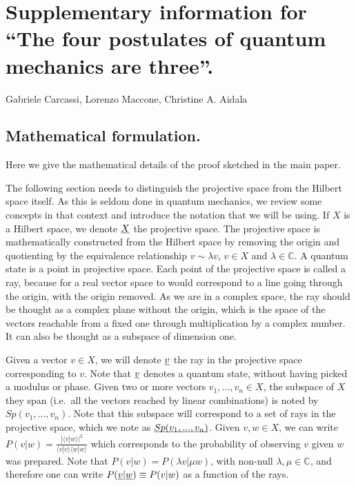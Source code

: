 \documentclass[aps,prl,amsmath,amssymb,twocolumn,nofootinbib]{revtex4}
\theoremstyle{plain}
\theoremstyle{definition}
\theoremstyle{remark}
\newcommand{\pj}[1] {\underbar{$#1$}}
\def\>{\rangle}
\def\<{\langle}
\begin{document}
	
	
	\section{Supplementary information for ``The four postulates of quantum
		mechanics are three''. }\label{app}
	\par\noindent 
	Gabriele Carcassi, Lorenzo Maccone, Christine A. Aidala
	\subsection{ Mathematical formulation.}
	\setcounter{section}{1}
	\setcounter{equation}{0}
	\renewcommand{\theequation}{S\arabic{equation}}
	
	Here we give the mathematical details of the proof sketched in the
	main paper.
	
	The following section needs to distinguish the projective space from
	the Hilbert space itself. As this is seldom done in quantum mechanics,
	we review some concepts in that context and introduce the notation
	that we will be using. If $X$ is a Hilbert space, we denote $\pj{X}$
	the projective space. The projective space is mathematically
	constructed from the Hilbert space by removing the origin and
	quotienting by the equivalence relationship $v \sim \lambda v$, $v\in
	X$ and $\lambda\in\mathbb{C}$. A quantum state is a point in
	projective space. Each point of the projective space is called a ray,
	because for a real vector space to would correspond to a line going through
	the origin, with the origin removed. As we are in a complex space, the
	ray should be thought as a complex plane without the origin, which is
	the space of the vectors reachable from a fixed one through
	multiplication by a complex number. It can also be thought as a
	subspace of dimension one.
	
	Given a vector $v \in X$, we will denote $\pj{v}$ the ray in the
	projective space corresponding to $v$. Note that $\pj{v}$ denotes a
	quantum state, without having picked a modulus or phase. Given two or
	more vectors $v_1, ..., v_n \in X$, the subspace of $X$ they span
	(i.e.~all the vectors reached by linear combinations) is noted by
	$Sp(v_1, ..., v_n)$. Note that this subspace will correspond to a set
	of rays in the projective space, which we note as $\pj{Sp(v_1, ...,
		v_n)}$. Given $v,w \in X$, we can write $P(v|w) = \frac{|\< v | w
		\>|^2}{\< v | v \>\< w | w \>}$ which corresponds to the probability
	of observing $v$ given $w$ was prepared. Note that $P(v|w) = P(\lambda
	v| \mu w)$, with non-null $\lambda,\mu\in{\mathbb C}$, and therefore
	one can write $P(\pj{v} | \pj{w})\equiv P(v|w)$ as a function of the
	rays.
	
\end{document}
